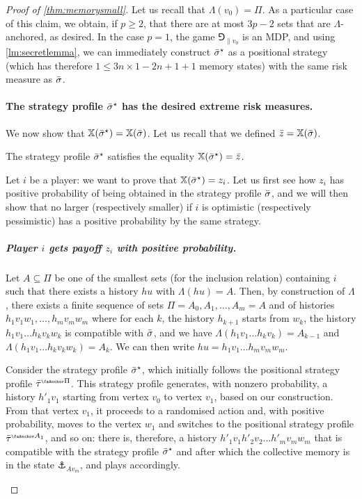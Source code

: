 \begin{proof}[Proof of \cref{thm:memorysmall}]
Let us recall that $\Lambda(v_0) = \Pi$.
As a particular case of this claim, we obtain, if $p \geq 2$, that there are at most $3p-2$ sets that are $\Lambda$-anchored, as desired.
In the case $p = 1$, the game $\Game_{\|v_0}$ is an MDP, and using \cref{lm:secretlemma}, we can immediately construct ${\bar{\sigma}}^\star$ as a positional strategy (which has therefore $1 \leq 3n \times 1 - 2n + 1 + 1$ memory states) with the same risk measure as ${\bar{\sigma}}$.




    \paragraph*{The strategy profile ${\bar{\sigma}}^\star$ has the desired extreme risk measures.}

We now show that $\mathbb{X}({\bar{\sigma}}^\star) = \mathbb{X}({\bar{\sigma}})$.
Let us recall that we defined $\bar{z} = \mathbb{X}({\bar{\sigma}})$.
    
\begin{proposition}\label{prop:ActualPayoff}
    The strategy profile ${\bar{\sigma}}^\star$ satisfies the equality $\mathbb{X}({\bar{\sigma}}^\star) = \bar{z}$.
\end{proposition}

\begin{claimproof}
    Let $i$ be a player: we want to prove that $\mathbb{X}({\bar{\sigma}}^\star) = z_i$.
    Let us first see how $z_i$ has positive probability of being obtained in the strategy profile ${\bar{\sigma}}$, and we will then show that no larger (respectively smaller) if $i$ is optimistic (respectively pessimistic) has a positive probability by the same strategy.

   

    \subparagraph*{Player $i$ gets payoff $z_i$ with positive probability.}
    Let $A \subseteq \Pi$ be one of the smallest sets (for the inclusion relation) containing $i$ such that there exists a history $hu$ with $\Lambda(hu) = A$.
    Then, by construction of $\Lambda$, there exists a finite sequence of sets $\Pi = A_0, A_1, \dots, A_m = A$ and of histories $h_1 v_1 w_1, \dots, h_m v_m w_m$ where for each $k$, the history $h_{k+1}$ starts from $w_k$, the history $h_1 v_1 \dots h_k v_k w_k$ is compatible with ${\bar{\sigma}}$, and we have $\Lambda(h_1 v_1 \dots h_k v_k) = A_{k-1}$ and $\Lambda(h_1 v_1 \dots h_k v_k w_k) = A_k$.
    We can then write $hu = h_1 v_1 \dots h_m v_m w_m$.
    
    Consider the strategy profile ${\bar{\sigma}}^\star$, which initially follows  the positional strategy profile $\btau^{\anch \Pi}$. This strategy profile generates, with nonzero probability, a history $h'_1 v_1$ starting from vertex $v_0$ to vertex $v_1$, based on our construction. 
    From that vertex $v_1$, it proceeds to a randomised action and, with positive probability, moves to the vertex $w_1$ and switches to the positional strategy profile $\btau^{\anch A_1}$, and so on: there is, therefore, a history $h'_1 v_1 h'_2 v_2 \dots h'_m v_m w_m$ that is compatible with the strategy profile ${\bar{\sigma}}^\star$ and after which the collective memory is in the state $\anchor_{A v_m}$, and plays accordingly.


\end{claimproof}
\end{proof}
